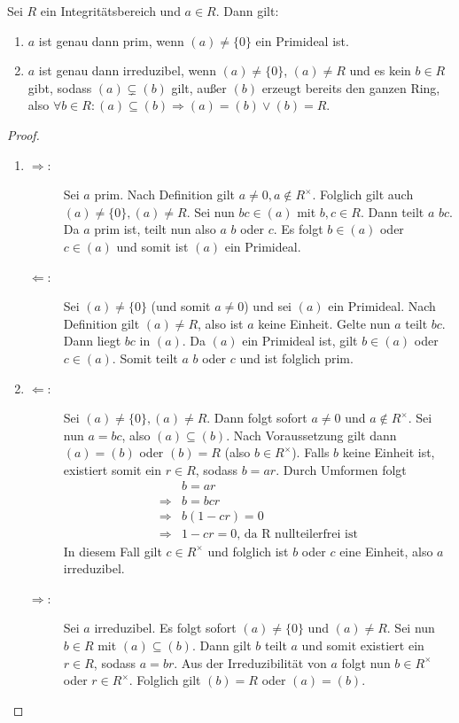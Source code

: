 \documentclass[12pt,a4paper]{scrartcl}
\begin{document}
\begin{lem} \label{lem:primired}
	Sei $R$ ein Integritätsbereich und $a\in R$. Dann gilt:
	\begin{enumerate}
		\item $a$ ist genau dann prim, wenn $(a) \neq \{0\}$ ein Primideal ist.
		\item $a$ ist genau dann irreduzibel, wenn $(a)\neq\{0\}$, $(a)\neq R$ und es kein $b \in R$ gibt, sodass $(a) \subsetneq (b)$ gilt, außer $(b)$ erzeugt bereits den ganzen Ring, also $\forall b\in R: (a) \subseteq (b)\Rightarrow (a) = (b) \vee (b) = R$.
	\end{enumerate}
\end{lem}
\begin{proof}
	\leavevmode
	\begin{enumerate}
	\item 
	\begin{description}
		\item[\glqq$\Rightarrow$\grqq:] Sei $a$ prim. Nach Definition gilt $a\neq 0, a\notin R^{\times}$. Folglich gilt auch $(a)\neq \{0\}, (a) \neq R$. Sei nun $bc\in (a)$ mit $b,c\in R$. Dann teilt $a$ $bc$. Da $a$ prim ist, teilt nun also $a$ $b$ oder $c$. Es folgt $b\in (a)$ oder $c\in (a)$ und somit ist $(a)$ ein Primideal.
		\item[\glqq$\Leftarrow$\grqq:] Sei $(a) \neq \{0\}$ (und somit $a\neq 0$) und sei $(a)$ ein Primideal. Nach Definition gilt $(a) \neq R$, also ist $a$ keine Einheit. Gelte nun $a$ teilt $bc$. Dann liegt $ bc$  in $(a)$. Da $(a)$ ein Primideal ist, gilt $b\in (a)$ oder $c\in (a)$. Somit teilt $a$ $b$ oder $c$ und ist folglich prim.
	\end{description}
	\item
	\begin{description}
		\item[\glqq$\Leftarrow$\grqq:] Sei $(a) \neq\{0\}, (a) \neq R$. Dann folgt sofort $a\neq 0$ und $a\notin R^{\times}$. Sei nun $a = bc$, also $(a)\subseteq (b)$. Nach Voraussetzung gilt dann $(a) = (b)$ oder $(b) = R$ (also $b\in R^{\times}$). Falls $b$ keine Einheit ist, existiert somit ein $r\in R$, sodass $b = ar$. Durch Umformen folgt
		\begin{align*}
			&b = ar \\
			\Rightarrow& b = bcr \\
			\Rightarrow& b(1-cr) = 0 \\
			\Rightarrow& 1-cr = 0 \text{, da R nullteilerfrei ist}
		\end{align*}
		In diesem Fall gilt $c \in R^{\times}$ und folglich ist $b$ oder $c$ eine Einheit, also $a$ irreduzibel.

		\item[\glqq$\Rightarrow$\grqq:] Sei $a$ irreduzibel. Es folgt sofort $(a) \neq \{0\}$ und $(a)\neq R$. Sei nun $b\in R$ mit $(a) \subseteq (b)$. Dann gilt $b$ teilt $a$ und somit existiert ein $r\in R$, sodass $a = br$. Aus der Irreduzibilität von $a$ folgt nun $b\in R^{\times}$ oder $r\in R^{\times}$. Folglich gilt $(b) = R$ oder $(a) = (b)$.
	\end{description}
\end{enumerate}
\end{proof}
\end{document}

